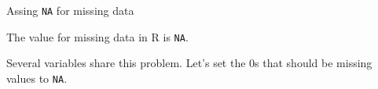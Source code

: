\begin{frame}[fragile]{Assing \texttt{NA} for missing data}
\protect\hypertarget{assing-na-for-missing-data}{}

The value for missing data in R is \texttt{NA}.

Several variables share this problem. Let's set the 0s that should be
missing values to \texttt{NA}.

\begin{Shaded}
\begin{Highlighting}[]
\OperatorTok{$}\NormalTok{diastolic[pima}\OperatorTok{$}\OperatorTok{==}\StringTok{ }\NormalTok{]  <-}\StringTok{ }
\OperatorTok{$}\NormalTok{glucose[pima}\OperatorTok{$}\OperatorTok{==}\StringTok{ }\NormalTok{] <-}\StringTok{ }
\OperatorTok{$}\NormalTok{triceps[pima}\OperatorTok{$}\OperatorTok{==}\StringTok{ }\NormalTok{]  <-}\StringTok{ }
\OperatorTok{$}\NormalTok{insulin[pima}\OperatorTok{$}\OperatorTok{==}\StringTok{ }\NormalTok{] <-}\StringTok{ }
\OperatorTok{$}\NormalTok{bmi[pima}\OperatorTok{$}\OperatorTok{==}\StringTok{ }\NormalTok{] <-}\StringTok{ }
\end{Highlighting}
\end{Shaded}

\end{frame}


